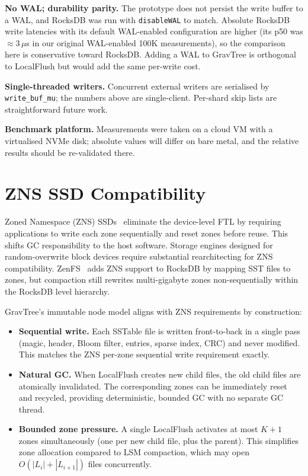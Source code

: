 \documentclass[10pt,twocolumn]{article}
\begin{document}
\textbf{No WAL; durability parity.}  The prototype does not persist the
write buffer to a WAL, and RocksDB was run with \texttt{disableWAL} to match.
Absolute RocksDB write latencies with its default WAL-enabled configuration
are higher (its p50 was $\approx 3\,\mu$s in our original WAL-enabled 100K measurements),
so the comparison here is conservative toward RocksDB.  Adding a WAL to
GravTree is orthogonal to LocalFlush but would add the same per-write cost.

\textbf{Single-threaded writers.}  Concurrent external writers are serialised
by \texttt{write\_buf\_mu}; the numbers above are single-client.  Per-shard
skip lists are straightforward future work.

\textbf{Benchmark platform.}  Measurements were taken on a cloud VM with a
virtualised NVMe disk; absolute values will differ on bare metal, and the
relative results should be re-validated there.

\section{ZNS SSD Compatibility}
\label{sec:zns}

Zoned Namespace (ZNS) SSDs~\cite{zns} eliminate the device-level FTL by
requiring applications to write each zone sequentially and reset zones before
reuse.  This shifts GC responsibility to the host software.  Storage engines
designed for random-overwrite block devices require substantial rearchitecting
for ZNS compatibility.  ZenFS~\cite{zenfs} adds ZNS support to RocksDB by
mapping SST files to zones, but compaction still rewrites multi-gigabyte zones
non-sequentially within the RocksDB level hierarchy.

GravTree's immutable node model aligns with ZNS requirements by construction:

\begin{itemize}
  \item \textbf{Sequential write.}  Each SSTable file is written front-to-back
        in a single pass (magic, header, Bloom filter, entries, sparse index,
        CRC) and never modified.  This matches the ZNS per-zone sequential
        write requirement exactly.
  \item \textbf{Natural GC.}  When LocalFlush creates new child files, the old
        child files are atomically invalidated.  The corresponding zones can be
        immediately reset and recycled, providing deterministic, bounded GC
        with no separate GC thread.
  \item \textbf{Bounded zone pressure.}  A single LocalFlush activates at most
        $K + 1$ zones simultaneously (one per new child file, plus the parent).
        This simplifies zone allocation compared to LSM compaction, which may
        open $O(|L_i| + |L_{i+1}|)$ files concurrently.
\end{itemize}
\end{document}

